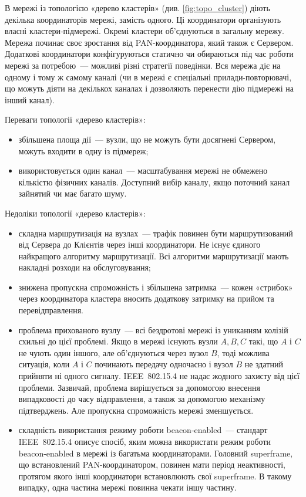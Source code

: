 \documentclass[a4paper,ukrainian,utf8,nocolumnsxix,nocolumnxxxii,nocolumnxxxi,floatsection,equationsection]{eskdtext}
\newcommand{\iee}[0]{IEEE~802.15.4\xspace}
\newcommand{\bem}[0]{beacon-enabled\xspace}
\begin{document}
В мережі із топологією «дерево кластерів» (див. \cref{fig:topo_cluster}) діють декілька координаторів мережі, замість одного. Ці координатори організують власні кластери-підмережі. Окремі кластери об'єднуються в загальну мережу. Мережа починає своє зростання від PAN-координатора, який також є Сервером. Додаткові координатори конфігуруються статично чи обираються під час роботи мережі за потребою~--- можливі різні стратегії поведінки. Вся мережа діє на одному і тому ж самому каналі (чи в мережі є спеціальні прилади-повторювачі, що можуть діяти на декількох каналах і дозволяють перенести дію підмережі на інший канал).

Переваги топології «дерево кластерів»:
\begin{itemize}
	\item збільшена площа дії~--- вузли, що не можуть бути досягнені Сервером, можуть входити в одну із підмереж;
	\item використовується один канал~--- масштабування мережі не обмежено кількістю фізичних каналів. Доступний вибір каналу, якщо поточний канал зайнятий чи має багато шуму.
\end{itemize}

Недоліки топології «дерево кластерів»:
\begin{itemize}
	\item складна маршрутизація на вузлах~--- трафік повинен бути маршрутизований від Сервера до Клієнтів через інші координатори. Не існує єдиного найкращого алгоритму маршрутизації. Всі алгоритми маршрутизації мають накладні розходи на обслуговування;
	\item знижена пропускна спроможність і збільшена затримка~--- кожен «стрибок» через координатора кластера вносить додаткову затримку на прийом та перевідправлення. 
	\item проблема прихованого вузлу~--- всі бездротові мережі із униканням колізій схильні до цієї проблемі. Якщо в мережі існують вузли $A,B,C$ такі, що $A$ і $C$ не чують один іншого, але об'єднуються через вузол $B$, тоді можлива ситуація, коли $A$ і $C$ починають передачу одночасно і вузол $B$ не здатний прийняти ні одного сигналу. \iee не надає жодного захисту від цієї проблеми. Зазвичай, проблема вирішується за допомогою внесення випадковості до часу відправлення, а також за допомогою механізму підтверджень. Але пропускна спроможність мережі зменшується.
	\item складність використання режиму роботи \bem~--- стандарт \iee описує спосіб, яким можна використати режим роботи \bem в мережі із багатьма координаторами. Головний superframe, що встановлений PAN-координатором, повинен мати період неактивності, протягом якого інші координатори встановлюють свої superframe. В такому випадку, одна частина мережі повинна чекати іншу частину.
\end{itemize}
\end{document}

